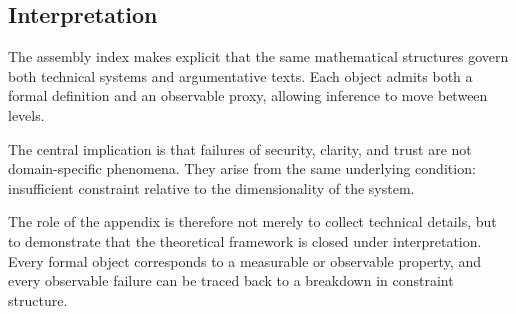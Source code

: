 \documentclass[12pt, oneside]{article}
\theoremstyle{plain}
\theoremstyle{definition}
\theoremstyle{remark}
\begin{document}
\subsection{Interpretation}

The assembly index makes explicit that the same mathematical structures govern both
technical systems and argumentative texts. Each object admits both a formal definition
and an observable proxy, allowing inference to move between levels.

The central implication is that failures of security, clarity, and trust are not
domain-specific phenomena. They arise from the same underlying condition: insufficient
constraint relative to the dimensionality of the system.

The role of the appendix is therefore not merely to collect technical details, but to
demonstrate that the theoretical framework is closed under interpretation. Every formal
object corresponds to a measurable or observable property, and every observable failure
can be traced back to a breakdown in constraint structure.
\end{document}
